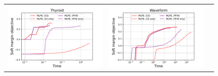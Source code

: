 \begin{figure}[p]
\begin{tabular}{ccc}
\begin{minipage}[t]{0.31\hsize}
            \includegraphics[keepaspectratio, scale=0.30]
            {figure/compare_fw_thyroid.pdf}
        \end{minipage}
        &
        \begin{minipage}[t]{0.31\hsize}
            \centering
            \includegraphics[keepaspectratio, scale=0.30]
            {figure/compare_fw_waveform.pdf}
        \end{minipage}
        &
        \begin{minipage}[t]{0.31\hsize}
            \centering
            \includegraphics[keepaspectratio, scale=0.30]

\end{minipage}
\end{tabular}
\end{figure}
